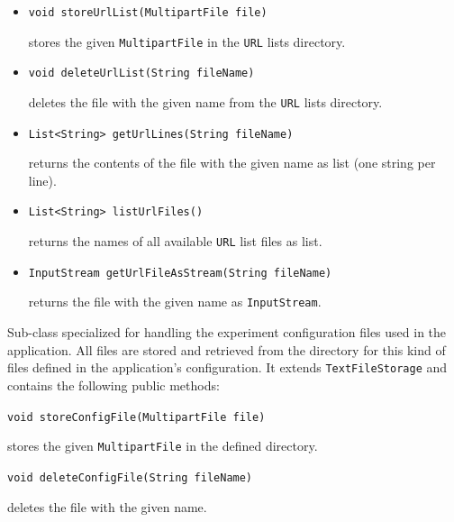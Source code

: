 \documentclass[a4paper]{usiinfbachelorproject}
\begin{document}
\begin{description}
            \begin{itemize}

                \item \texttt{void storeUrlList(MultipartFile file)}

                    stores the given \texttt{MultipartFile} in the \texttt{URL} lists directory.

                \item \texttt{void deleteUrlList(String fileName)}

                    deletes the file with the given name from the \texttt{URL} lists directory.

                \item \texttt{List<String> getUrlLines(String fileName)}

                    returns the contents of the file with the given name as list (one string per line).

                \item \texttt{List<String> listUrlFiles()}

                    returns the names of all available \texttt{URL} list files as list.

                \item \texttt{InputStream getUrlFileAsStream(String fileName)}

                    returns the file with the given name as \texttt{InputStream}.

            \end{itemize}

        \item[ExperimentConfigStorage] Sub-class specialized for handling the experiment configuration files used in the application.
                        All files are stored and retrieved from the directory for this kind of files defined in the application's configuration.
                        It extends \texttt{TextFileStorage} and contains the following public methods:

            \item \texttt{void storeConfigFile(MultipartFile file)}

                stores the given \texttt{MultipartFile} in the defined directory.

            \item \texttt{void deleteConfigFile(String fileName)}

                deletes the file with the given name.


\end{description}
\end{document}
